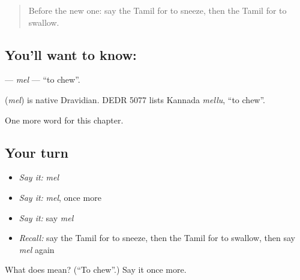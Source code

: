 \label{lesson:TA-C226-mel}



\begin{quote}
Before the new one: say the Tamil for to sneeze, then the Tamil for to swallow.
\end{quote}

\subsection*{You'll want to know: }
\textbf{} — \emph{mel} — \textquotedblleft{}to chew\textquotedblright{}.

\begin{cousinweb}
\textbf{} (\emph{mel}) is native Dravidian. DEDR 5077 lists Kannada \emph{mellu}, \textquotedblleft{}to chew\textquotedblright{}.
\end{cousinweb}

\begin{grammarlens}[title={What you've built}]
One more word for this chapter.
\end{grammarlens}

\subsection*{Your turn}
\begin{itemize}
\raggedright
  \item \emph{Say it:} \emph{mel}
  \item \emph{Say it:} \emph{mel}, once more
  \item \emph{Say it:} say \emph{mel}
  \item \emph{Recall:} say the Tamil for to sneeze, then the Tamil for to swallow, then say \emph{mel} again
\end{itemize}

\begin{tcolorbox}[breakable,colback=teal!4,colframe=teal!35!black,title={Before you move on}]
What does  mean? (\textquotedblleft{}To chew\textquotedblright{}.) Say it once more.
\end{tcolorbox}
